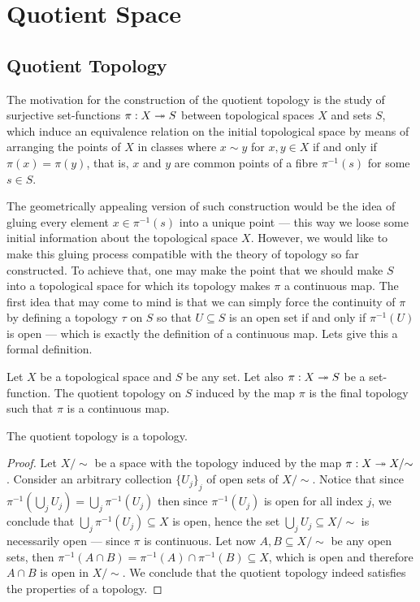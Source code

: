 \section{Quotient Space}

\subsection{Quotient Topology}

The motivation for the construction of the quotient topology is the study of
surjective set-functions \(\pi: X \twoheadrightarrow S\) between topological spaces \(X\) and
sets \(S\), which induce an equivalence relation on the initial topological
space by means of arranging the points of \(X\) in classes where \(x \sim y\)
for \(x, y \in X\) if and only if \(\pi(x) = \pi(y)\), that is, \(x\) and \(y\)
are common points of a fibre \(\pi^{-1}(s)\) for some \(s \in S\).

The geometrically appealing version of such construction would be the idea of
gluing every element \(x \in \pi^{-1}(s)\) into a unique point --- this way we
loose some initial information about the topological space \(X\). However, we
would like to make this gluing process compatible with the theory of topology so
far constructed. To achieve that, one may make the point that we should make
\(S\) into a topological space for which its topology makes \(\pi\) a continuous
map. The first idea that may come to mind is that we can simply force the
continuity of \(\pi\) by defining a topology \(\tau\) on \(S\) so that
\(U \subseteq S\) is an open set if and only if \(\pi^{-1}(U)\) is open ---
which is exactly the definition of a continuous map. Lets give this a formal
definition.

\begin{definition}\label{def:quotient-topology}
    Let \(X\) be a topological space and \(S\) be any set. Let also \(\pi: X \twoheadrightarrow S\)
    be a set-function. The quotient topology on \(S\) induced by the map \(\pi\) is
    the final topology such that \(\pi\) is a continuous map.
\end{definition}

\begin{proposition}
    The quotient topology is a topology.
\end{proposition}

\begin{proof}
    Let \(X /{\sim}\) be a space with the topology induced by the map
    \(\pi: X \twoheadrightarrow X /{\sim}\). Consider an arbitrary collection \({\{U_{j}\}}_j\) of
    open sets of \(X /{\sim}\). Notice that since
    \(\pi^{-1}(\bigcup_{j} U_{j}) = \bigcup_j \pi^{-1}(U_j)\) then since
    \(\pi^{-1}(U_j)\) is open for all index \(j\), we conclude that
    \(\bigcup_j \pi^{-1}(U_{j}) \subseteq X\) is open, hence the set
    \(\bigcup_j U_j \subseteq X /{\sim}\) is necessarily open --- since \(\pi\) is
    continuous. Let now \(A, B \subseteq X /{\sim}\) be any open sets, then
    \(\pi^{-1}(A \cap B) = \pi^{-1}(A) \cap \pi^{-1}(B) \subseteq X\), which is open
    and therefore \(A \cap B\) is open in \(X /{\sim}\). We conclude that the
    quotient topology indeed satisfies the properties of a topology.
\end{proof}

